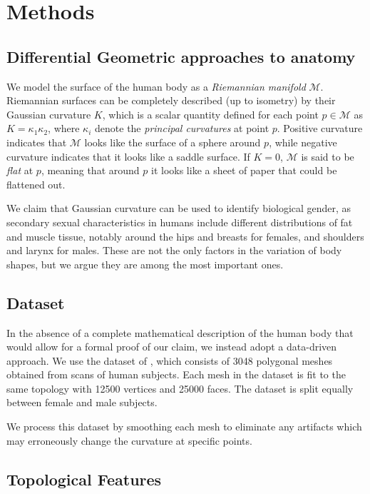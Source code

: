 \documentclass[11pt]{article}
\begin{document}
\section{Methods}

\subsection{Differential Geometric approaches to anatomy}

We model the surface of the human body as a \textit{Riemannian manifold} $\mathcal{M}$. Riemannian surfaces can be completely described (up to isometry) by their Gaussian curvature $K$, which is a scalar quantity defined for each point $p \in \mathcal{M}$ as $K = \kappa_1 \kappa_2$, where $\kappa_i$ denote the \textit{principal curvatures} at point $p$. Positive curvature indicates that $\mathcal{M}$ looks like the surface of a sphere around $p$, while negative curvature indicates that it looks like a saddle surface. If $K=0$, $\mathcal{M}$ is said to be \textit{flat} at $p$, meaning that around $p$ it looks like a sheet of paper that could be flattened out.

We claim that Gaussian curvature can be used to identify biological gender, as secondary sexual characteristics in humans include different distributions of fat and muscle tissue, notably around the hips and breasts for females, and shoulders and larynx for males. These are not the only factors in the variation of body shapes, but we argue they are among the most important ones.

\subsection{Dataset}

In the absence of a complete mathematical description of the human body that would allow for a formal proof of our claim, we instead adopt a data-driven approach. We use the dataset of \cite{Yang2014}, which consists of 3048 polygonal meshes obtained from scans of human subjects. Each mesh in the dataset is fit to the same topology with 12500 vertices and 25000 faces. The dataset is split equally between female and male subjects.

We process this dataset by smoothing each mesh to eliminate any artifacts which may erroneously change the curvature at specific points.

\subsection{Topological Features}
\end{document}
